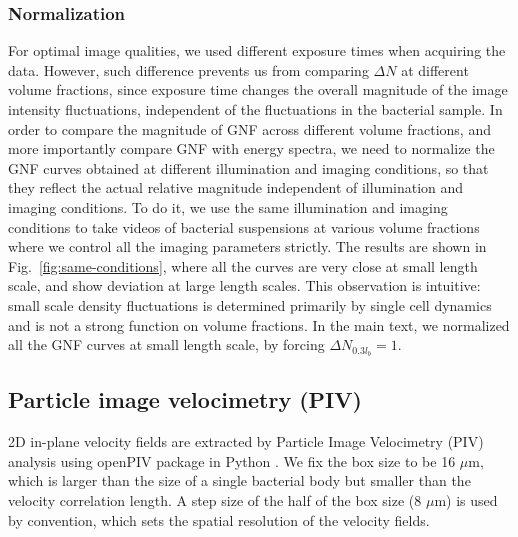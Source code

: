 \documentclass[twocolumn,aps,prx,amsmath,amssymb,longbibliography]{revtex4-2}
\begin{document}


\subsubsection{Normalization}

For optimal image qualities, we used different exposure times when acquiring the data. However, such difference prevents us from comparing $\Delta N$ at different volume fractions, since exposure time changes the overall magnitude of the image intensity fluctuations, independent of the fluctuations in the bacterial sample. In order to compare the magnitude of GNF across different volume fractions, and more importantly compare GNF with energy spectra, we need to normalize the GNF curves obtained at different illumination and imaging conditions, so that they reflect the actual relative magnitude independent of illumination and imaging conditions. To do it, we use the same illumination and imaging conditions to take videos of bacterial suspensions at various volume fractions where we control all the imaging parameters strictly.  The results are shown in Fig.~\ref{fig:same-conditions}, where all the curves are very close at small length scale, and show deviation at large length scales. This observation is intuitive: small scale density fluctuations is determined primarily by single cell dynamics and is not a strong function on volume fractions. In the main text, we normalized all the GNF curves at small length scale, by forcing $\Delta N_{0.3l_b}=1$.


\subsection{Particle image velocimetry (PIV)}

2D in-plane velocity fields are extracted by Particle Image Velocimetry (PIV) analysis using openPIV package in Python \cite{Liberzon2020}. %
We fix the box size to be 16 $\mu$m, which is larger than the size of a single bacterial body but smaller than the velocity correlation length. A step size of the half of the box size (8 $\mu$m) is used by convention, which sets the spatial resolution of the velocity fields.
\end{document}
